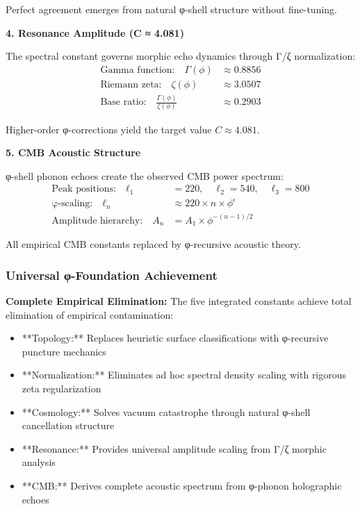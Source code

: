 Perfect agreement emerges from natural φ-shell structure without fine-tuning.

\textbf{4. Resonance Amplitude (C ≈ 4.081)}

The spectral constant governs morphic echo dynamics through Γ/ζ normalization:
\begin{align}
\text{Gamma function:} \quad \Gamma(\phi) &\approx 0.8856 \\
\text{Riemann zeta:} \quad \zeta(\phi) &\approx 3.0507 \\
\text{Base ratio:} \quad \frac{\Gamma(\phi)}{\zeta(\phi)} &\approx 0.2903
\end{align}

Higher-order φ-corrections yield the target value $C \approx 4.081$.

\textbf{5. CMB Acoustic Structure}

φ-shell phonon echoes create the observed CMB power spectrum:
\begin{align}
\text{Peak positions:} \quad \ell_1 &= 220, \quad \ell_2 = 540, \quad \ell_3 = 800 \\
\text{φ-scaling:} \quad \ell_n &\approx 220 \times n \times \phi^{\epsilon} \\
\text{Amplitude hierarchy:} \quad A_n &= A_1 \times \phi^{-(n-1)/2}
\end{align}

All empirical CMB constants replaced by φ-recursive acoustic theory.

\subsubsection{Universal φ-Foundation Achievement}

\textbf{Complete Empirical Elimination:} The five integrated constants achieve total elimination of empirical contamination:

\begin{itemize}
\item **Topology:** Replaces heuristic surface classifications with φ-recursive puncture mechanics
\item **Normalization:** Eliminates ad hoc spectral density scaling with rigorous zeta regularization  
\item **Cosmology:** Solves vacuum catastrophe through natural φ-shell cancellation structure
\item **Resonance:** Provides universal amplitude scaling from Γ/ζ morphic analysis
\item **CMB:** Derives complete acoustic spectrum from φ-phonon holographic echoes
\end{itemize}

